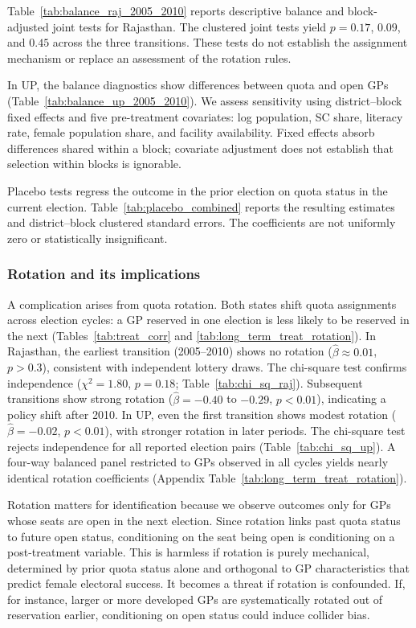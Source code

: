 \documentclass[12pt]{article}
\begin{document}
Table~\ref{tab:balance_raj_2005_2010} reports descriptive balance and block-adjusted joint tests for Rajasthan. The clustered joint tests yield $p=0.17$, $0.09$, and $0.45$ across the three transitions. These tests do not establish the assignment mechanism or replace an assessment of the rotation rules.

In UP, the balance diagnostics show differences between quota and open GPs (Table~\ref{tab:balance_up_2005_2010}). We assess sensitivity using district--block fixed effects and five pre-treatment covariates: log population, SC share, literacy rate, female population share, and facility availability. Fixed effects absorb differences shared within a block; covariate adjustment does not establish that selection within blocks is ignorable.

Placebo tests regress the outcome in the prior election on quota status in the current election. Table~\ref{tab:placebo_combined} reports the resulting estimates and district--block clustered standard errors. The coefficients are not uniformly zero or statistically insignificant.

\subsubsection*{Rotation and its implications}

A complication arises from quota rotation. Both states shift quota assignments across election cycles: a GP reserved in one election is less likely to be reserved in the next (Tables~\ref{tab:treat_corr} and \ref{tab:long_term_treat_rotation}). In Rajasthan, the earliest transition (2005--2010) shows no rotation ($\hat{\beta} \approx 0.01$, $p > 0.3$), consistent with independent lottery draws. The chi-square test confirms independence ($\chi^2 = 1.80$, $p = 0.18$; Table~\ref{tab:chi_sq_raj}). Subsequent transitions show strong rotation ($\hat{\beta} = -0.40$ to $-0.29$, $p < 0.01$), indicating a policy shift after 2010. In UP, even the first transition shows modest rotation ($\hat{\beta} = -0.02$, $p < 0.01$), with stronger rotation in later periods. The chi-square test rejects independence for all reported election pairs (Table~\ref{tab:chi_sq_up}). A four-way balanced panel restricted to GPs observed in all cycles yields nearly identical rotation coefficients (Appendix Table~\ref{tab:long_term_treat_rotation}).

Rotation matters for identification because we observe outcomes only for GPs whose seats are open in the next election. Since rotation links past quota status to future open status, conditioning on the seat being open is conditioning on a post-treatment variable. This is harmless if rotation is purely mechanical, determined by prior quota status alone and orthogonal to GP characteristics that predict female electoral success. It becomes a threat if rotation is confounded. If, for instance, larger or more developed GPs are systematically rotated out of reservation earlier, conditioning on open status could induce collider bias.
\end{document}

